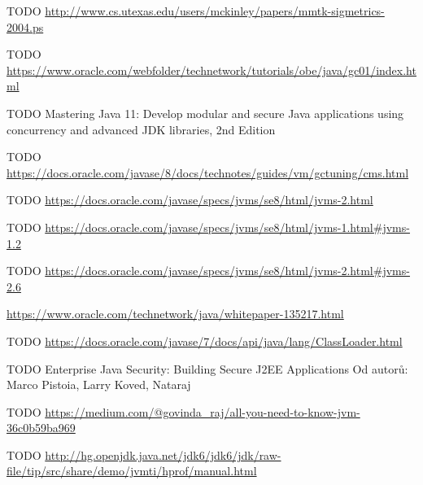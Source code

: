\begin{literatura}{99}
    TODO \url{http://www.cs.utexas.edu/users/mckinley/papers/mmtk-sigmetrics-2004.ps}

    TODO \url{https://www.oracle.com/webfolder/technetwork/tutorials/obe/java/gc01/index.html}

    TODO Mastering Java 11: Develop modular and secure Java applications using concurrency and advanced JDK libraries, 2nd Edition

    TODO \url{https://docs.oracle.com/javase/8/docs/technotes/guides/vm/gctuning/cms.html}

    TODO \url{https://docs.oracle.com/javase/specs/jvms/se8/html/jvms-2.html}

    TODO \url{https://docs.oracle.com/javase/specs/jvms/se8/html/jvms-1.html#jvms-1.2}

    TODO \url{https://docs.oracle.com/javase/specs/jvms/se8/html/jvms-2.html#jvms-2.6}

    \url{https://www.oracle.com/technetwork/java/whitepaper-135217.html}

    TODO \url{https://docs.oracle.com/javase/7/docs/api/java/lang/ClassLoader.html}

    TODO Enterprise Java Security: Building Secure J2EE Applications
    Od autorů: Marco Pistoia, Larry Koved, Nataraj 

    TODO \url{https://medium.com/@govinda_raj/all-you-need-to-know-jvm-36c0b59ba969}

    TODO \url{http://hg.openjdk.java.net/jdk6/jdk6/jdk/raw-file/tip/src/share/demo/jvmti/hprof/manual.html}

\end{literatura}